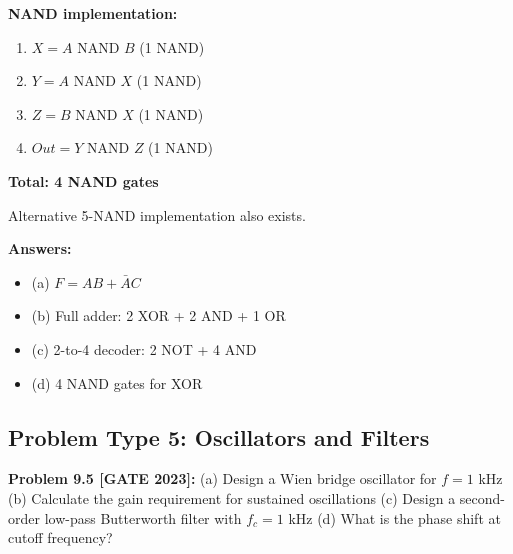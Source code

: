 \documentclass[12pt,a4paper]{article}
\begin{document}
\begin{solution}
\textbf{NAND implementation:}
\begin{enumerate}
    \item $X = A \text{ NAND } B$ (1 NAND)
    \item $Y = A \text{ NAND } X$ (1 NAND)
    \item $Z = B \text{ NAND } X$ (1 NAND)
    \item $Out = Y \text{ NAND } Z$ (1 NAND)
\end{enumerate}

\textbf{Total: 4 NAND gates}

Alternative 5-NAND implementation also exists.

\textbf{Answers:}
\begin{itemize}
    \item (a) $F = AB + \bar{A}C$
    \item (b) Full adder: 2 XOR + 2 AND + 1 OR
    \item (c) 2-to-4 decoder: 2 NOT + 4 AND
    \item (d) 4 NAND gates for XOR
\end{itemize}
\end{solution}

\subsection{Problem Type 5: Oscillators and Filters}

\textbf{Problem 9.5 [GATE 2023]:}
(a) Design a Wien bridge oscillator for $f = 1$ kHz
(b) Calculate the gain requirement for sustained oscillations
(c) Design a second-order low-pass Butterworth filter with $f_c = 1$ kHz
(d) What is the phase shift at cutoff frequency?
\end{document}
